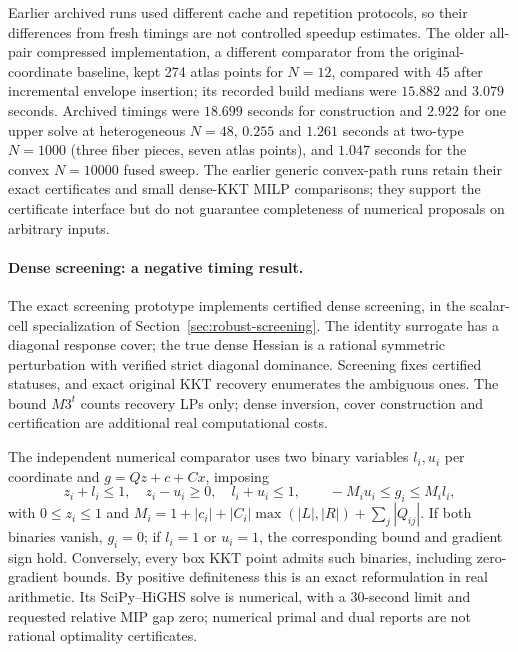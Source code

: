 Earlier archived runs used different cache and repetition protocols, so
their differences from fresh timings are not controlled speedup estimates.
The older all-pair compressed implementation, a different comparator from the
original-coordinate baseline, kept 274 atlas points for $N=12$, compared with
45 after incremental envelope insertion; its recorded build medians were
$15.882$ and $3.079$ seconds. Archived timings were $18.699$ seconds for
construction and $2.922$ for one upper solve at heterogeneous $N=48$, $0.255$
and $1.261$ seconds at two-type $N=1000$ (three fiber pieces, seven atlas
points), and $1.047$ seconds for the convex $N=10000$ fused sweep. The earlier
generic convex-path runs retain their exact certificates and small dense-KKT
MILP comparisons; they support the certificate interface but do not guarantee
completeness of numerical proposals on arbitrary inputs.

\paragraph{Dense screening: a negative timing result.}\label{para:screening-results}
The exact screening prototype implements certified dense screening, in the
scalar-cell specialization of
Section~\ref{sec:robust-screening}. The identity surrogate has a diagonal
response cover; the true dense Hessian is a rational symmetric perturbation
with verified strict diagonal dominance. Screening fixes certified statuses,
and exact original KKT recovery enumerates the ambiguous ones. The bound
$M3^t$ counts recovery LPs only; dense inversion, cover construction and
certification are additional real computational costs.

The independent numerical comparator uses two binary variables $l_i,u_i$ per
coordinate and $g=Qz+c+Cx$, imposing
\[
 z_i+l_i\le1,\quad z_i-u_i\ge0,\quad l_i+u_i\le1,
 \qquad -M_i u_i\le g_i\le M_i l_i,
\]
with $0\le z_i\le1$ and
$M_i=1+|c_i|+|C_i|\max(|L|,|R|)+\sum_j|Q_{ij}|$.
If both binaries vanish, $g_i=0$; if $l_i=1$ or $u_i=1$, the corresponding
bound and gradient sign hold. Conversely, every box KKT point admits such
binaries, including zero-gradient bounds. By positive definiteness this is an
exact reformulation in real arithmetic. Its SciPy--HiGHS solve is numerical,
with a 30-second limit and requested relative MIP gap zero; numerical primal
and dual reports are not rational optimality certificates.

